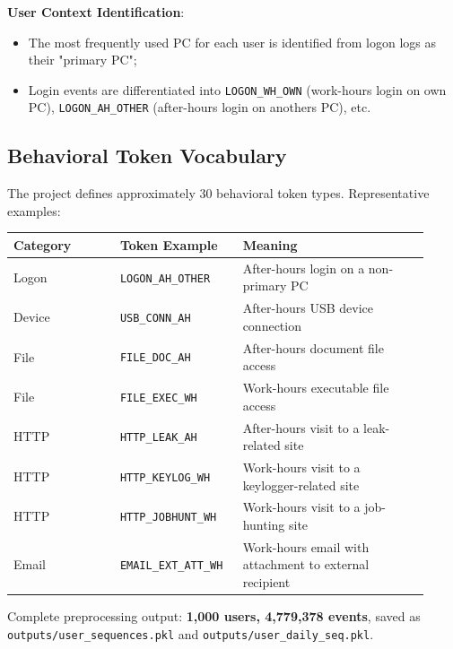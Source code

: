 \documentclass[
  a4paper,
  11pt]{article}
\newcounter{none} %
\providecommand{\tightlist}{%
  \setlength{\itemsep}{0pt}\setlength{\parskip}{0pt}}
\begin{document}
\textbf{User Context Identification}:

\begin{itemize}
\tightlist
\item
  The most frequently used PC for each user is identified from logon
  logs as their "primary PC";
\item
  Login events are differentiated into \texttt{LOGON\_WH\_OWN}
  (work-hours login on own PC), \texttt{LOGON\_AH\_OTHER} (after-hours
  login on another\textquotesingle s PC), etc.
\end{itemize}

\subsection{Behavioral Token
Vocabulary}\label{behavioral-token-vocabulary}

The project defines approximately 30 behavioral token types.
Representative examples:

{\def\LTcaptype{none} %
\begin{longtable}[]{@{}>{\raggedright\arraybackslash}p{0.24\linewidth}>{\raggedright\arraybackslash}p{0.26\linewidth}>{\raggedright\arraybackslash}p{0.42\linewidth}@{}}
\toprule\noalign{}
Category & Token Example & Meaning \\
\midrule\noalign{}
\endhead
\bottomrule\noalign{}
\endlastfoot
Logon & \texttt{LOGON\_AH\_OTHER} & After-hours login on a non-primary
PC \\
Device & \texttt{USB\_CONN\_AH} & After-hours USB device connection \\
File & \texttt{FILE\_DOC\_AH} & After-hours document file access \\
File & \texttt{FILE\_EXEC\_WH} & Work-hours executable file access \\
HTTP & \texttt{HTTP\_LEAK\_AH} & After-hours visit to a leak-related
site \\
HTTP & \texttt{HTTP\_KEYLOG\_WH} & Work-hours visit to a
keylogger-related site \\
HTTP & \texttt{HTTP\_JOBHUNT\_WH} & Work-hours visit to a job-hunting
site \\
Email & \texttt{EMAIL\_EXT\_ATT\_WH} & Work-hours email with attachment
to external recipient \\
\end{longtable}
}

Complete preprocessing output: \textbf{1,000 users, 4,779,378 events},
saved as \texttt{outputs/user\_sequences.pkl} and
\texttt{outputs/user\_daily\_seq.pkl}.
\end{document}
